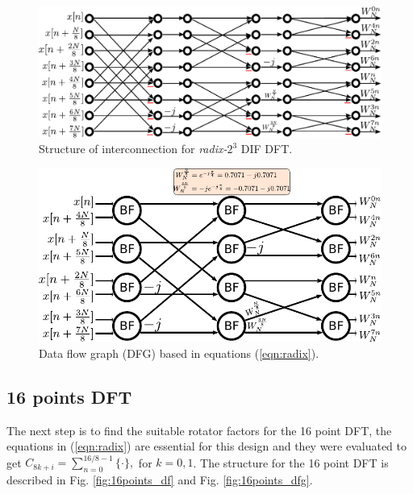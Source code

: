 \documentclass[10pt,times,mathptm,psfig,final,journal,comsoc]{IEEEtran}
\begin{document}
\begin{figure}[ht] 
	\centering
	\includegraphics[width=\linewidth]{Diagramas/miSeccionFiguras/8PuntosRadix8Conexion.pdf}
	\caption{Structure of interconnection for \textit{radix-}$2^3$ DIF DFT.}
	\label{fig:8ponits_df}
\end{figure}

\begin{figure} [ht]
	\centering
	\includegraphics[width=\linewidth]{Diagramas/miSeccionFiguras/8PuntosRadix8Burbujas.pdf}
	\caption{Data flow graph (DFG) based in equations (\ref{eqn:radix}).}
	\label{fig:8ponits_dfg}
\end{figure}

\subsection{16 points DFT}
The next step is to find the suitable rotator factors for the 16 point DFT, the equations in (\ref{eqn:radix}) are essential for this design and they were evaluated to get $C_{8k+i} = \sum_{n=0}^{16/8-1} \{ \cdot \}, $ for $k=0,1$. The structure for the 16 point DFT is described in Fig. \ref{fig:16points_df} and Fig. \ref{fig:16points_dfg}. 
\end{document}
